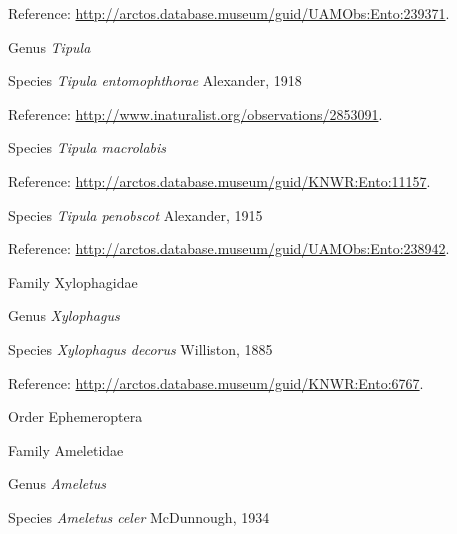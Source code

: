 \documentclass[9pt, article]{memoir}
\begin{document}
\begin{multicols}{2}
Reference: 
\url{http://arctos.database.museum/guid/UAMObs:Ento:239371}.

\vspace{6pt}\noindent\hspace{30pt}Genus \textit{Tipula}


\vspace{6pt}\noindent\hspace{36pt}Species \textit{Tipula entomophthorae} Alexander, 1918


Reference: 
\url{http://www.inaturalist.org/observations/2853091}.

\vspace{6pt}\noindent\hspace{36pt}Species \textit{Tipula macrolabis}


Reference: 
\url{http://arctos.database.museum/guid/KNWR:Ento:11157}.

\vspace{6pt}\noindent\hspace{36pt}Species \textit{Tipula penobscot} Alexander, 1915


Reference: 
\url{http://arctos.database.museum/guid/UAMObs:Ento:238942}.

\vspace{6pt}\noindent\hspace{24pt}Family Xylophagidae


\vspace{6pt}\noindent\hspace{30pt}Genus \textit{Xylophagus}


\vspace{6pt}\noindent\hspace{36pt}Species \textit{Xylophagus decorus} Williston, 1885


Reference: 
\url{http://arctos.database.museum/guid/KNWR:Ento:6767}.

\vspace{6pt}\noindent\hspace{18pt}Order Ephemeroptera


\vspace{6pt}\noindent\hspace{24pt}Family Ameletidae


\vspace{6pt}\noindent\hspace{30pt}Genus \textit{Ameletus}


\vspace{6pt}\noindent\hspace{36pt}Species \textit{Ameletus celer} McDunnough, 1934



\end{multicols}
\end{document}
